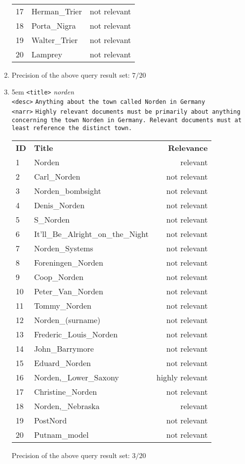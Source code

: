 \documentclass[10pt,a4paper]{article}
\begin{document}
\begin{enumerate}
\begin{tabular}[t]{llr}
        17	& Herman\_Trier	& not relevant\\
        18	& Porta\_Nigra	& not relevant\\
        19	& Walter\_Trier	& not relevant\\
        20	& Lamprey	& not relevant
        \end{tabular}
    \setcounter{enumi}{2}
    \item Precision of the above query result set: $ 7/20 $
    \item \emergencystretch 5em%
        \texttt{<title>}  \textit{norden}\\
        \texttt{<desc>} \texttt{Anything about the town called Norden in Germany}\\
        \texttt{<narr>} \texttt{Highly relevant documents must be primarily about anything concerning the town Norden in Germany. Relevant documents must at least reference the distinct town.}
        
        \begin{tabular}[t]{llr}
        \textbf{ID} & \textbf{Title}            & \textbf{Relevance}  \\
        1	& Norden	& relevant\\
        2	& Carl\_Norden	& not relevant\\
        3	& Norden\_bombsight	& not relevant\\
        4	& Denis\_Norden	& not relevant\\
        5	& S\_Norden	& not relevant\\
        6	& It'll\_Be\_Alright\_on\_the\_Night	& not relevant\\
        7	& Norden\_Systems	& not relevant\\
        8	& Foreningen\_Norden	& not relevant\\
        9	& Coop\_Norden	& not relevant\\
        10	& Peter\_Van\_Norden	& not relevant\\
        11	& Tommy\_Norden	& not relevant\\
        12	& Norden\_(surname)	& not relevant\\
        13	& Frederic\_Louis\_Norden	& not relevant\\
        14	& John\_Barrymore	& not relevant\\
        15	& Eduard\_Norden	& not relevant\\
        16	& Norden,\_Lower\_Saxony	& highly relevant\\
        17	& Christine\_Norden	& not relevant\\
        18	& Norden,\_Nebraska	& relevant\\
        19	& PostNord	& not relevant\\
        20	& Putnam\_model	& not relevant
        \end{tabular}
        
        Precision of the above query result set: $ 3/20 $
\end{enumerate}
\end{document}
